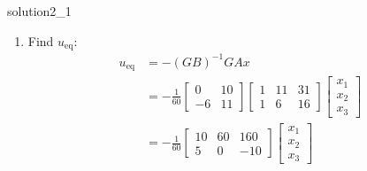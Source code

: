 \begin{solution}{}{solution2_1}
\begin{enumerate}
		\item Find \( u_{\text{eq}} \):
		      \[
			      \begin{aligned}
				      u_{\text{eq}} & = - (GB)^{-1} GAx \\
				                    & = -\frac{1}{60}
				      \begin{bmatrix}
					      0  & 10 \\
					      -6 & 11
				      \end{bmatrix}
				      \begin{bmatrix}
					      1 & 11 & 31 \\
					      1 & 6  & 16
				      \end{bmatrix}
				      \begin{bmatrix}
					      x_1 \\ x_2 \\ x_3
				      \end{bmatrix}                  \\
				                    & = -\frac{1}{60}
				      \begin{bmatrix}
					      10 & 60 & 160 \\
					      5  & 0  & -10
				      \end{bmatrix} \begin{bmatrix}
					                    x_1 \\ x_2 \\ x_3
				                    \end{bmatrix}
			      \end{aligned}
		      \]


\end{enumerate}
\end{solution}
